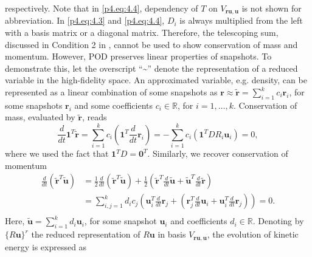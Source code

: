 respectively. Note that in \eqref{p4.eq:4.4}, dependency of $T$ on $V_{\mathbf r \mathbf u , \mathbf u}$ is not shown for abbreviation. In \eqref{p4.eq:4.3} and \eqref{p4.eq:4.4}, $D_i$ is always multiplied from the left with a basis matrix or a diagonal matrix. Therefore, the telescoping sum, discussed in Condition 2 in , cannot be used to show conservation of mass and momentum. However, POD preserves linear properties of snapshots. To demonstrate this, let the overscript ``\textasciitilde'' denote the representation of a reduced variable in the high-fidelity space. An approximated variable, e.g. density, can be represented as a linear combination of some snapshots as $\mathbf r \approx \tilde{\mathbf r} = \sum_{i=1}^k c_i \mathbf r_i$, for some snapshots $\mathbf r_i$ and some coefficients $c_i \in \mathbb R$, for $i=1,\dots,k$. Conservation of mass, evaluated by $\tilde{\mathbf r}$, reads
\begin{equation} \label{p4.eq:4.5}
	\frac{d}{dt} \mathbf 1^T \tilde {\mathbf r} = \sum_{i=1}^k c_i  \left( \mathbf 1^T \frac{d}{dt} \mathbf r_i \right) = - \sum_{i=1}^k c_i  \left( \mathbf 1^T DR_i\mathbf u_i \right) = 0,
\end{equation}
where we used the fact that $\mathbf 1^T D = \mathbf 0^T$. Similarly, we recover conservation of momentum
\begin{equation} \label{p4.eq:4.6}
\begin{aligned}
	\frac{d}{dt}(\tilde {\mathbf r}^T \tilde{\mathbf u}) &= \frac{1}{2} \frac{d}{dt}(\tilde{\mathbf r}^T \tilde{\mathbf u}) + \frac{1}{2} \left( \tilde{ \mathbf r }^T \frac d{dt} \tilde{ \mathbf u } + \tilde {\mathbf u}^T \frac{d}{dt} \tilde {\mathbf r} \right)\\
	&= \sum_{i,j=1}^k d_i c_j \left( \mathbf u_i^T \frac{d}{dt} \mathbf r_j + \left( \mathbf r_j^T \frac d{dt} \mathbf u_i +\mathbf u_i^T \frac{d}{dt} \mathbf r_j \right)\right) = 0.\\
\end{aligned}
\end{equation}
Here, $\tilde{\mathbf u} = \sum_{i=1}^k d_i \mathbf u_i$, for some snapshot $\mathbf u_i$ and coefficients $d_i \in \mathbb R$. Denoting by $\{ R \mathbf u\}^r$ the reduced representation of $R\mathbf u$ in basis $V_{\mathbf r \mathbf u , \mathbf u}$, the evolution of kinetic energy is expressed as
